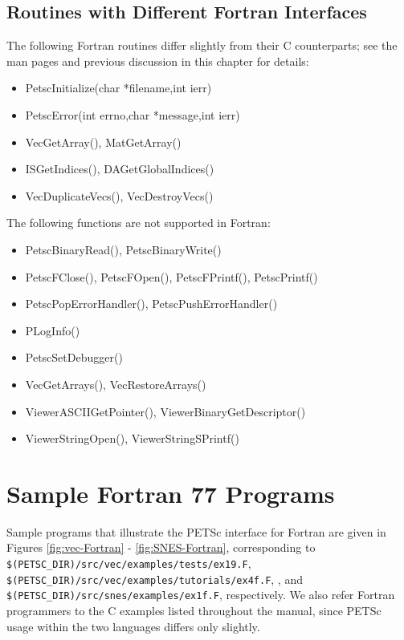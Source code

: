 \subsection{Routines with Different Fortran Interfaces}
\label{sec:fortran_exceptions}

The following Fortran routines differ slightly from their C counterparts; see the 
man pages and previous discussion in this chapter for details:
\begin{itemize}
\item PetscInitialize(char *filename,int ierr)
\item PetscError(int errno,char *message,int ierr)
\item VecGetArray(), MatGetArray()
\item ISGetIndices(), DAGetGlobalIndices()
\item VecDuplicateVecs(), VecDestroyVecs()
\end{itemize}
The following functions are not supported in Fortran:
\begin{itemize}
\item PetscBinaryRead(), PetscBinaryWrite()
\item PetscFClose(), PetscFOpen(), PetscFPrintf(), PetscPrintf()
\item PetscPopErrorHandler(), PetscPushErrorHandler()
\item PLogInfo()
\item PetscSetDebugger()
\item VecGetArrays(), VecRestoreArrays()
\item ViewerASCIIGetPointer(), ViewerBinaryGetDescriptor()
\item ViewerStringOpen(), ViewerStringSPrintf()
\end{itemize}

\section{Sample Fortran 77 Programs}
\label{sec:fortran-examples}

Sample programs that illustrate the PETSc interface for Fortran
are given in Figures \ref{fig:vec-Fortran} - \ref{fig:SNES-Fortran},
corresponding to
{\tt \$(PETSC\_DIR)/src/vec/examples/tests/ex19.F}, 
{\tt \$(PETSC\_DIR)/src/vec/examples/tutorials/ex4f.F}, 
, and 
{\tt \$(PETSC\_DIR)/src/snes/examples/ex1f.F}, respectively.  We also
refer Fortran programmers to the C examples listed throughout the manual,
since PETSc usage within the two languages differs only slightly.

